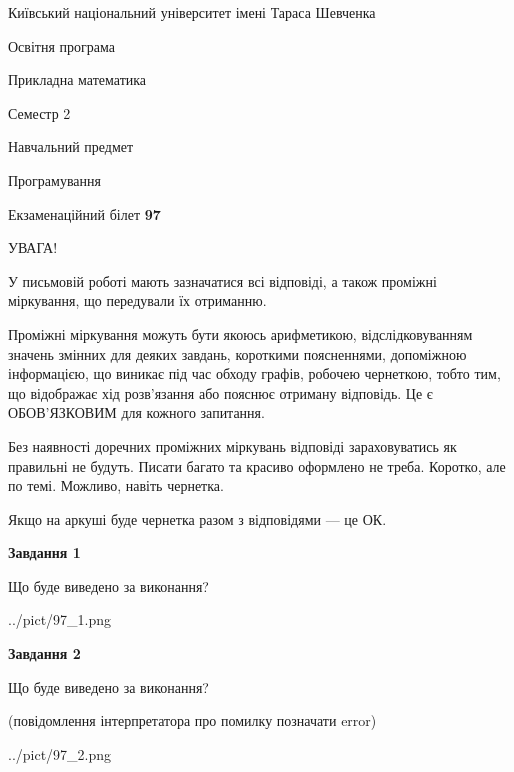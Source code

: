 \documentclass[12pt, ukrainian]{article}
\begin{document}
{{\begin {small}\par
{ \center  Київський національний університет імені Тараса Шевченка \par}
{\parbox {5 cm}{Освітня програма \hfill}{\parbox {7 cm}{Прикладна математика\hfill}}\parbox {6 cm}{\hfill Семестр 2}}\par
{\parbox {5 cm} {Навчальний предмет \hfill}\parbox {7 cm}{Програмування \hfill}\parbox {6cm}{\hfill}\par}\vspace{-7pt} \end{small}}{\center Екзаменаційний білет \No \textbf
{ 97 }\par}}
{
\begin {large}
УВАГА!

У письмовій роботі мають зазначатися всі відповіді, а також проміжні міркування, що передували їх отриманню.

Проміжні міркування можуть бути якоюсь арифметикою, відслідковуванням зна\-чень змінних для деяких завдань,
короткими поясненнями, допоміжною інформацією, що виникає під час обходу графів, робочею чернеткою,
тобто тим, що відображає хід розв’язання або пояснює отриману відповідь.
Це є ОБОВ’ЯЗКОВИМ для кожного запитання.

Без наявності доречних проміжних міркувань відповіді зараховуватись як правиль\-ні не будуть.
Писати багато та красиво оформлено не треба. Коротко, але по темі. Можли\-во, навіть чернетка.

Якщо на аркуші буде чернетка разом з відповідями --- це ОК.

\newpage

{\begin {center}\textbf{Завдання 1}\end {center}}\par
Що буде виведено за виконання?\par
\begin{center}
	{../pict/97_1.png}
\end{center}
\newpage

{\begin {center}\textbf{Завдання 2}\end {center}}\par
Що буде виведено за виконання?\par
 (повідомлення інтерпретатора про помилку позначати error)\par
\begin{center}
	{../pict/97_2.png}
\end{center}
\newpage


\end{large}}
\end{document}
